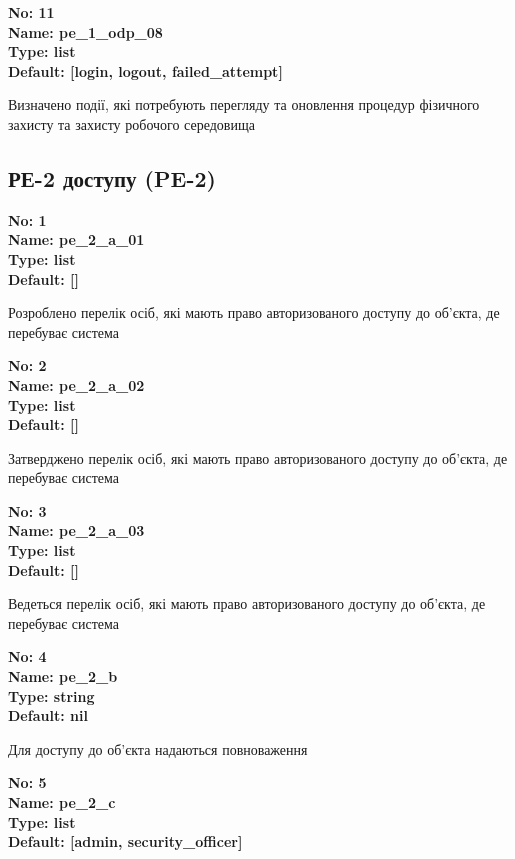 \documentclass{article}
\begin{document}
{\footnotesize\bfseries
No: 11\\
Name: pe\_\allowbreak{}1\_\allowbreak{}odp\_\allowbreak{}08\\
Type: list\\
Default: [\textquotedbl{}login\textquotedbl{}, \textquotedbl{}logout\textquotedbl{}, \textquotedbl{}failed\_\allowbreak{}attempt\textquotedbl{}]
}

{\footnotesize Визначено події, які потребують перегляду та оновлення процедур фізичного захисту та захисту робочого середовища}




\subsection{РЕ-2 доступу (PE-2)}


\vspace{10pt}
{\footnotesize\bfseries
No: 1\\
Name: pe\_\allowbreak{}2\_\allowbreak{}a\_\allowbreak{}01\\
Type: list\\
Default: []
}

{\footnotesize Розроблено перелік осіб, які мають право авторизованого доступу до об'єкта, де перебуває система}


{\footnotesize\bfseries
No: 2\\
Name: pe\_\allowbreak{}2\_\allowbreak{}a\_\allowbreak{}02\\
Type: list\\
Default: []
}

{\footnotesize Затверджено перелік осіб, які мають право авторизованого доступу до об'єкта, де перебуває система}


{\footnotesize\bfseries
No: 3\\
Name: pe\_\allowbreak{}2\_\allowbreak{}a\_\allowbreak{}03\\
Type: list\\
Default: []
}

{\footnotesize Ведеться перелік осіб, які мають право авторизованого доступу до об'єкта, де перебуває система}


{\footnotesize\bfseries
No: 4\\
Name: pe\_\allowbreak{}2\_\allowbreak{}b\\
Type: string\\
Default: nil
}

{\footnotesize Для доступу до об'єкта надаються повноваження}


{\footnotesize\bfseries
No: 5\\
Name: pe\_\allowbreak{}2\_\allowbreak{}c\\
Type: list\\
Default: [\textquotedbl{}admin\textquotedbl{}, \textquotedbl{}security\_\allowbreak{}officer\textquotedbl{}]
}
\end{document}
